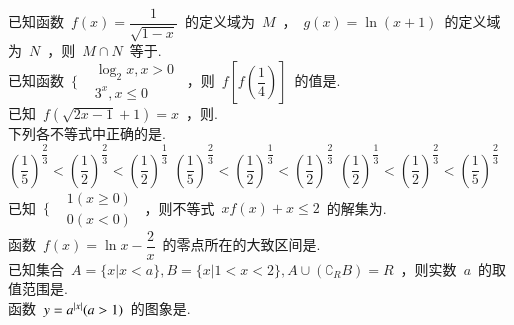 \documentclass{BHCexam}
\begin{document}
\maketitle
\notice
\begin{questions}

\xuanze
\question 已知函数~$f(x)=\dfrac{1}{\sqrt{1-x}}$~的定义域为~$M$~，~$g(x)=\ln(x+1)$~的定义域为~$N$~，则~$M\cap N$~等于\xx.\\
\qs 已知函数~$ \Bigg\{\begin{aligned}
&\log_2 x,x>0 \\
&3^x,x\leqslant 0
\end{aligned} $~，则~$f[f(\dfrac{1}{4})]$~的值是\xx.\\
\question 已知~$f(\sqrt{2x-1}+1)=x$~，则\xx.\\
\question 下列各不等式中正确的是\xx.\\
{$\left(\dfrac{1}{5} \right)^{\dfrac{2}{3}}<\left(\dfrac{1}{2} \right)^{\dfrac{2}{3}}<\left(\dfrac{1}{2} \right)^{\dfrac{1}{3}}$}
{$\left(\dfrac{1}{5} \right)^{\dfrac{2}{3}}<\left(\dfrac{1}{2} \right)^{\dfrac{1}{3}}<\left(\dfrac{1}{2} \right)^{\dfrac{2}{3}}$}
{$\left(\dfrac{1}{2} \right)^{\dfrac{1}{3}}<\left(\dfrac{1}{2} \right)^{\dfrac{2}{3}}<\left(\dfrac{1}{5} \right)^{\dfrac{2}{3}}$}
\question  已知~$ \Bigg\{\begin{aligned}
&1(x\geq 0) \\
&0(x<0)
\end{aligned} $~，则不等式~$xf(x)+x\leq 2$~的解集为\xx.\\
\onech{$(-\infty,1]$}{$[0,2]$}{$(-\infty,2]$}{$[0,1]$}
\question 函数~$f(x)=\ln x-\dfrac{2}{x}$~的零点所在的大致区间是\xx.\\
\question 已知集合~$A=\{x|x<a \},B=\{x|1<x<2 \},A\cup (\complement_R B)=R$~，则实数~$a$~的取值范围是\xx.\\
\question 函数~$y=a^{\left| x \right|}(a>1)$~的图象是\xx.\\
\end{questions}
\end{document}
